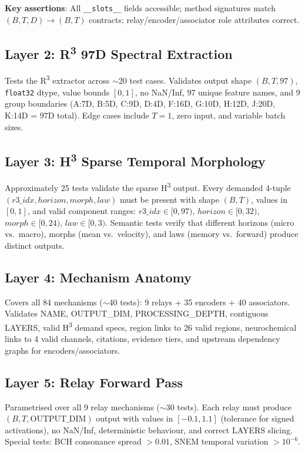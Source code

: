 \documentclass[10pt,twocolumn]{article}
\newcommand{\Rthree}{R\textsuperscript{3}}
\newcommand{\Hthree}{H\textsuperscript{3}}
\begin{document}
\textbf{Key assertions}: All \texttt{\_\_slots\_\_} fields accessible; method signatures match $(B,T,D)\to(B,T)$ contracts; relay/encoder/associator role attributes correct.

\subsection{Layer 2: \Rthree{} 97D Spectral Extraction}

Tests the \Rthree{} extractor across $\sim$20 test cases. Validates output shape $(B,T,97)$, \texttt{float32} dtype, value bounds $[0,1]$, no NaN/Inf, 97 unique feature names, and 9 group boundaries (A:7D, B:5D, C:9D, D:4D, F:16D, G:10D, H:12D, J:20D, K:14D = 97D total). Edge cases include $T\!=\!1$, zero input, and variable batch sizes.

\subsection{Layer 3: \Hthree{} Sparse Temporal Morphology}

Approximately 25 tests validate the sparse \Hthree{} output. Every demanded 4-tuple $(r3\_idx, horizon, morph, law)$ must be present with shape $(B,T)$, values in $[0,1]$, and valid component ranges: $r3\_idx \in [0,97)$, $horizon \in [0,32)$, $morph \in [0,24)$, $law \in [0,3)$. Semantic tests verify that different horizons (micro vs.\ macro), morphs (mean vs.\ velocity), and laws (memory vs.\ forward) produce distinct outputs.

\subsection{Layer 4: Mechanism Anatomy}

Covers all 84 mechanisms ($\sim$40 tests): 9 relays + 35 encoders + 40 associators. Validates NAME, OUTPUT\_DIM, PROCESSING\_DEPTH, contiguous LAYERS, valid \Hthree{} demand specs, region links to 26 valid regions, neurochemical links to 4 valid channels, citations, evidence tiers, and upstream dependency graphs for encoders/associators.

\subsection{Layer 5: Relay Forward Pass}

Parametrised over all 9 relay mechanisms ($\sim$30 tests). Each relay must produce $(B,T,\text{OUTPUT\_DIM})$ output with values in $[-0.1, 1.1]$ (tolerance for signed activations), no NaN/Inf, deterministic behaviour, and correct LAYERS slicing. Special tests: BCH consonance spread $> 0.01$, SNEM temporal variation $> 10^{-6}$.
\end{document}
